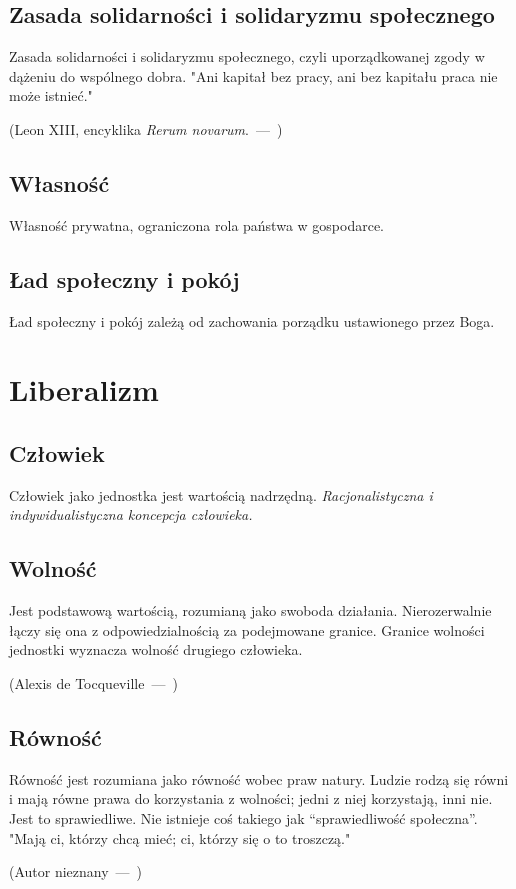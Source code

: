 \documentclass[a4paper]{article}
\let\oldquote\quote
\let\endoldquote\endquote
\renewenvironment{quote}[2][]
  {\if\relax\detokenize{#1}\relax
     \def\quoteauthor{#2}%
   \else
     \def\quoteauthor{#2~---~#1}%
   \fi
   \oldquote}
  {\par\nobreak\smallskip\hfill(\quoteauthor)%
   \endoldquote\addvspace{\bigskipamount}}
\begin{document}
\subsection{Zasada solidarności i solidaryzmu społecznego}
Zasada solidarności i solidaryzmu społecznego, czyli uporządkowanej zgody w dążeniu do wspólnego dobra.
\begin{quote}{Leon XIII, encyklika \emph{Rerum novarum}.}
    "Ani kapitał bez pracy, ani bez kapitału praca nie może istnieć."
\end{quote}
\subsection{Własność}
Własność prywatna, ograniczona rola państwa w gospodarce.
\subsection{Ład społeczny i pokój}
Ład społeczny i pokój zależą od zachowania porządku ustawionego przez Boga.
\section{Liberalizm}
\subsection{Człowiek}
Człowiek jako jednostka jest wartością nadrzędną.
\emph{Racjonalistyczna i indywidualistyczna koncepcja człowieka.}
\subsection{Wolność}
Jest podstawową wartością, rozumianą jako swoboda działania.
Nierozerwalnie łączy się ona z odpowiedzialnością za podejmowane granice.
\begin{quote}{Alexis de Tocqueville}
    Granice wolności jednostki wyznacza wolność drugiego człowieka.
\end{quote}
\subsection{Równość}
Równość jest rozumiana jako równość wobec praw natury. Ludzie rodzą się równi i
mają równe prawa do korzystania z wolności; jedni z niej korzystają, inni nie.
Jest to sprawiedliwe. Nie istnieje coś takiego jak ``sprawiedliwość społeczna''.
\begin{quote}{Autor nieznany}
    "Mają ci, którzy chcą mieć; ci, którzy się o to troszczą."
\end{quote}
\end{document}
